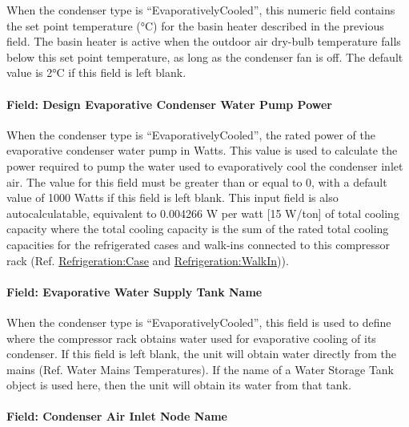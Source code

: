 When the condenser type is ``EvaporativelyCooled'', this numeric field contains the set point temperature (°C) for the basin heater described in the previous field. The basin heater is active when the outdoor air dry-bulb temperature falls below this set point temperature, as long as the condenser fan is off. The default value is 2°C if this field is left blank.

\paragraph{Field: Design Evaporative Condenser Water Pump Power}\label{field-design-evaporative-condenser-water-pump-power}

When the condenser type is ``EvaporativelyCooled'', the rated power of the evaporative condenser water pump in Watts. This value is used to calculate the power required to pump the water used to evaporatively cool the condenser inlet air. The value for this field must be greater than or equal to 0, with a default value of 1000 Watts if this field is left blank. This input field is also autocalculatable, equivalent to 0.004266 W per watt {[}15 W/ton{]} of total cooling capacity where the total cooling capacity is the sum of the rated total cooling capacities for the refrigerated cases and walk-ins connected to this compressor rack (Ref. \hyperref[refrigerationcase]{Refrigeration:Case} and \hyperref[refrigerationwalkin]{Refrigeration:WalkIn})).

\paragraph{Field: Evaporative Water Supply Tank Name}\label{field-evaporative-water-supply-tank-name}

When the condenser type is ``EvaporativelyCooled'', this field is used to define where the compressor rack obtains water used for evaporative cooling of its condenser. If this field is left blank, the unit will obtain water directly from the mains (Ref. Water Mains Temperatures). If the name of a Water Storage Tank object is used here, then the unit will obtain its water from that tank.

\paragraph{Field: Condenser Air Inlet Node Name}\label{field-condenser-air-inlet-node-name-000}

